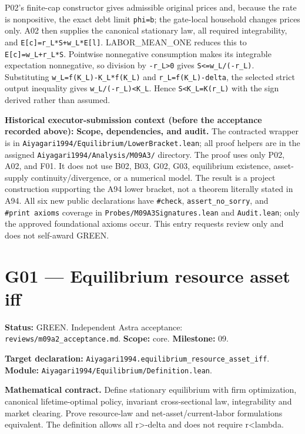 \documentclass[
  11pt,
]{article}
\let\LedgerOriginalTexttt\texttt
\renewcommand{\texttt}[1]{{\small\LedgerOriginalTexttt{#1}}}
\begin{document}
P02's finite-cap constructor gives admissible original prices and,
because the rate is nonpositive, the exact debt limit \texttt{phi=b};
the gate-local household changes prices only. A02 then supplies the
canonical stationary law, all required integrability, and
\texttt{E{[}c{]}=r\_L*S+w\_L*E{[}l{]}}. LABOR\_MEAN\_ONE reduces this to
\texttt{E{[}c{]}=w\_L+r\_L*S}. Pointwise nonnegative consumption makes
its integrable expectation nonnegative, so division by
\texttt{-r\_L\textgreater{}0} gives \texttt{S\textless{}=w\_L/(-r\_L)}.
Substituting \texttt{w\_L=f(K\_L)-K\_L*f\textquotesingle{}(K\_L)} and
\texttt{r\_L=f\textquotesingle{}(K\_L)-delta}, the selected strict
output inequality gives \texttt{w\_L/(-r\_L)\textless{}K\_L}. Hence
\texttt{S\textless{}K\_L=K(r\_L)} with the sign derived rather than
assumed.

\textbf{Historical executor-submission context (before the acceptance
recorded above):} \textbf{Scope, dependencies, and audit.} The
contracted wrapper is in
\texttt{Aiyagari1994/Equilibrium/LowerBracket.lean}; all proof helpers
are in the assigned \texttt{Aiyagari1994/Analysis/M09A3/} directory. The
proof uses only P02, A02, and F01. It does not use B02, B03, G02, G03,
equilibrium existence, asset-supply continuity/divergence, or a
numerical model. The result is a project construction supporting the A94
lower bracket, not a theorem literally stated in A94. All six new public
declarations have \texttt{\#check}, \texttt{assert\_no\_sorry}, and
\texttt{\#print\ axioms} coverage in
\texttt{Probes/M09A3Signatures.lean} and \texttt{Audit.lean}; only the
approved foundational axioms occur. This entry requests review only and
does not self-award GREEN.

\section{G01 --- Equilibrium resource asset
iff}\label{g01-equilibrium-resource-asset-iff}

\textbf{Status:} GREEN. Independent Astra acceptance:
\texttt{reviews/m09a2\_acceptance.md}. \textbf{Scope:} core.
\textbf{Milestone:} 09.

\textbf{Target declaration:}
\texttt{Aiyagari1994.equilibrium\_resource\_asset\_iff}.\\
\textbf{Module:} \texttt{Aiyagari1994/Equilibrium/Definition.lean}.

\textbf{Mathematical contract.} Define stationary equilibrium with firm
optimization, canonical lifetime-optimal policy, invariant
cross-sectional law, integrability and market clearing. Prove
resource-law and net-asset/current-labor formulations equivalent. The
definition allows all r\textgreater-delta and does not require
r\textless lambda.
\end{document}
